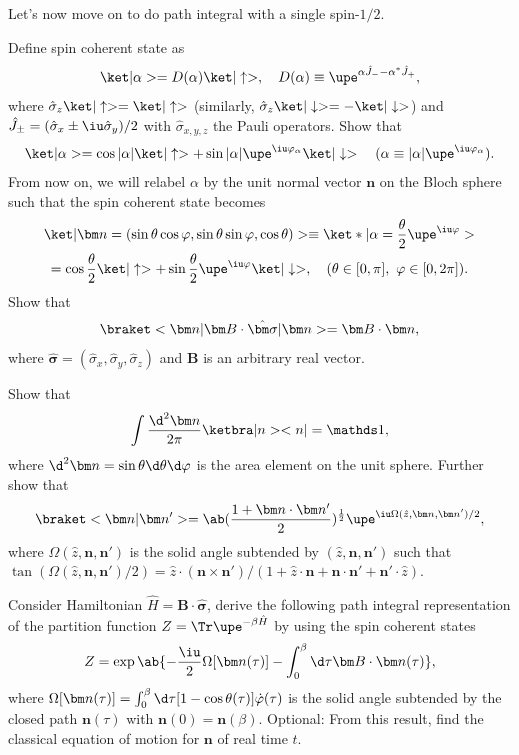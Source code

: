 \begin{problem}
  Let's now move on to do path integral with a single spin-$1/2$.
  \begin{enumext}
    \item Define spin coherent state as
    \[
      \ket|\alpha> = D(\alpha) \ket|\uparrow>, \quad
      D(\alpha) \equiv \upe^{\alpha\hat J_--\alpha^*\hat J_+},
    \]
    where $\hat \sigma_z\ket|\uparrow> = \ket|\uparrow>$
    (similarly, $\hat \sigma_z\ket|\downarrow> = -\ket|\downarrow>$)
    and $\hat J_\pm = (\hat \sigma_x \pm \iu\hat \sigma_y)/2$ with
    $\hat\sigma_{x,y,z}$ the Pauli operators. Show that
    \[
      \ket|\alpha> = \cos|\alpha| \ket|\uparrow>
    + \sin|\alpha| \upe^{\iu\varphi_\alpha} \ket|\downarrow>\quad
      (\alpha \equiv |\alpha| \upe^{\iu\varphi_\alpha}).
    \]
    From now on, we will relabel $\alpha$ by the unit normal vector $\bm n$ on
    the Bloch sphere such that the spin coherent state becomes
    \begin{multline*}
      \ket|\bm n = (\sin\theta\cos\varphi, \sin\theta\sin\varphi, \cos\theta)>
    \equiv \ket*|\alpha = \frac\theta2\upe^{\iu\varphi}>\\
    = \cos\frac\theta2\ket|\uparrow>
    + \sin\frac\theta2\upe^{\iu\varphi} \ket|\downarrow>, \quad
      (\theta \in [0, \pi],\ \varphi \in [0, 2\pi]).
    \end{multline*}
    Show that
    \[
      \braket<\bm n|\bm B \cdot \hat{\bm \sigma}|\bm n> = \bm B \cdot \bm n,
    \]
    where $\hat{\bm \sigma} = (\hat \sigma_x, \hat \sigma_y, \hat \sigma_z)$
    and $\bm B$ is an arbitrary real vector.
    \item Show that
    \[
      \int \frac{\d^2\bm n}{2\pi} \ketbra|n><n| = \identity,
    \]
    where $\d^2\bm n = \sin\theta\d\theta\d\varphi$ is the area element on the
    unit sphere. Further show that
    \[
      \braket<\bm n|\bm n'> = \ab(\frac{1 + \bm n \cdot \bm n'}{2})^{\frac12}
      \upe^{\iu\Omega(\hat z, \bm n, \bm n')/2},
    \]
    where $\Omega(\hat z, \bm n, \bm n')$ is the solid angle subtended
    by $(\hat z, \bm n, \bm n')$ such that
    $\tan(\Omega(\hat z, \bm n, \bm n')/2) = \hat z \cdot (\bm n \times \bm n')/
      (1 + \hat z \cdot \bm n + \bm n \cdot \bm n' + \bm n' \cdot \hat z)$.
    \item Consider Hamiltonian $\hat H = \bm B \cdot \hat{\bm \sigma}$, derive
    the following path integral representation of the partition function
    $Z = \Tr\upe^{-\beta\hat H}$ by using the spin coherent states
    \[
      Z = \exp\ab\{-\frac\iu2 \Omega[\bm n(\tau)]
        - \int_0^\beta \d\tau \bm B \cdot \bm n(\tau)\},
    \]
    where $\Omega[\bm n(\tau)] = \int_0^\beta \d \tau[1 - \cos\theta(\tau)]
    \dot\varphi(\tau)$ is the solid angle subtended by the closed
    path $\bm n(\tau)$ with $\bm n(0) = \bm n(\beta)$. Optional: From this
    result, find the classical equation of motion for $\bm n$ of real time $t$.
  \end{enumext}
\end{problem}
